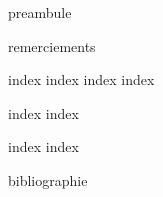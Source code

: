 


\frontmatter

\beautifultableofcontents

{preambule}

{remerciements}


\printglossary

\mainmatter

{index}
{index}
{index}
{index}


{index}
{index}


{index}
{index}


\backmatter

{bibliographie}



